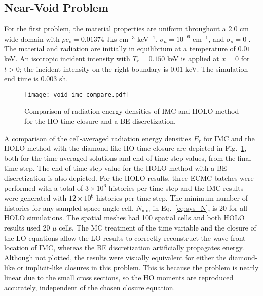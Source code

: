 \subsection{Near-Void Problem}

For the first problem, the material properties
are uniform throughout a 2.0 cm wide domain with $\rho c_v = 0.01374$ Jks cm$^{-3}$ keV$^{-1}$, $\sigma_a=10^{-6}$ cm$^{-1}$, and $\sigma_s=0$ \invcm.
The material and radiation are initially in equilibrium at a temperature of $0.01$ keV.
An isotropic incident intensity with $T_r = 0.150$ keV is applied
at $x=0$ for $t>0$; the incident intensity on the right boundary is $0.01$ keV.  The simulation end
time is 0.003 sh.      
\begin{figure}[H]
  \centering
    \texttt{[image: void\_imc\_compare.pdf]}
    \caption{\label{fig:void_imc_compare} Comparison of radiation energy densities of IMC
    and HOLO method for the HO time closure and a BE discretization.}
\end{figure}

A comparison of the cell-averaged radiation energy densities $E_r$ for IMC and the HOLO
method with the diamond-like HO time closure are depicted in Fig.~\ref{fig:void_imc_compare},
both for the time-averaged solutions and end-of time step values, from the final time
step.  The end of time step value for the HOLO method with a BE discretization is also depicted.
For the HOLO results, three ECMC batches were performed with
a total of $3\times10^6$ histories per time step and the IMC results were generated with
$12\times10^6$ histories per time step. 
The minimum number of histories for any sampled space-angle cell, $N_{\min}$ in
Eq.~\eqref{eq:sys_N}, is 20 for all HOLO simulations.
The spatial meshes had 100 spatial cells and both
HOLO results used 20 $\mu$ cells.  
The MC treatment of the time
variable and the closure of the LO equations allow the LO results to correctly reconstruct
the wave-front location of IMC, whereas the BE discretization artificially propagates
energy.   Although not plotted, the results were visually equivalent for either the diamond-like or implicit-like
closures in this problem.  This is because the problem is nearly linear due to the small
cross sections, so the HO moments are reproduced accurately, independent of the chosen closure
equation.  

